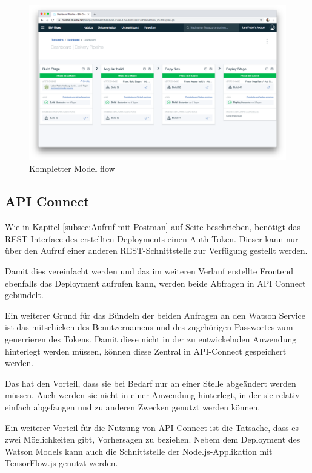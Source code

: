 \begin{figure}[h]
\centering
\includegraphics[scale=0.26]{images/kapitel_3/toolchain_pipeline.png}
\caption{Kompletter Model flow}
\label{fig:umsetzung_model_flow}
\end{figure}

\subsection{API Connect}
Wie in Kapitel \ref{subsec:Aufruf mit Postman} auf Seite \pageref{subsec:Aufruf mit Postman} beschrieben, benötigt das
REST-Interface des erstellten Deployments einen Auth-Token. Dieser kann nur über den Aufruf einer anderen
REST-Schnittstelle zur Verfügung gestellt werden.

Damit dies vereinfacht werden und das im weiteren Verlauf erstellte Frontend ebenfalls das Deployment aufrufen kann,
werden beide Abfragen in API Connect gebündelt.

Ein weiterer Grund für das Bündeln der beiden Anfragen an den Watson Service ist das mitschicken des Benutzernamens und
des zugehörigen Passwortes zum generrieren des Tokens. Damit diese nicht in der zu entwickelnden Anwendung hinterlegt
werden müssen, können diese Zentral in API-Connect gespeichert werden.

Das hat den Vorteil, dass sie bei Bedarf nur an einer Stelle abgeändert werden müssen. Auch werden sie nicht in einer
Anwendung hinterlegt, in der sie relativ einfach abgefangen und zu anderen Zwecken genutzt werden können.

Ein weiterer Vorteil für die Nutzung von API Connect ist die Tatsache, dass es zwei Möglichkeiten gibt, Vorhersagen zu
beziehen. Nebem dem Deployment des Watson Models kann auch die Schnittstelle der Node.js-Applikation mit TensorFlow.js
genutzt werden.

